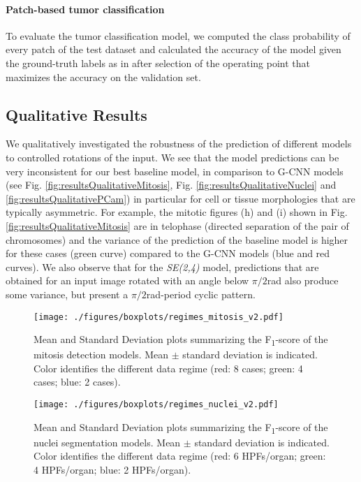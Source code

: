 \documentclass[twocolumn,final]{article}
\newcommand{\fscore}[1]{F\textsubscript{#1}-score}
\newcommand{\se}[1]{\textit{SE(#1)}}
\begin{document}
\paragraph{Patch-based tumor classification}
To evaluate the tumor classification model, we computed the class probability of every patch of the test dataset and calculated the accuracy of the model given the ground-truth labels as in \citet{veeling2018rotation} after selection of the operating point that maximizes the accuracy on the validation set.


\subsection{Qualitative Results}
\label{qualitativeResults}
We qualitatively investigated the robustness of the prediction of different models to controlled rotations of the input.
We see that the model predictions can be very inconsistent for our best baseline model, in comparison to G-CNN models (see Fig. \ref{fig:resultsQualitativeMitosis}, Fig. \ref{fig:resultsQualitativeNuclei} and \ref{fig:resultsQualitativePCam}) in particular for cell or tissue morphologies that are typically asymmetric.
For example, the mitotic figures (h) and (i) shown in Fig. \ref{fig:resultsQualitativeMitosis} are in telophase (directed separation of the pair of chromosomes) and the variance of the prediction of the baseline model is higher for these cases (green curve) compared to the G-CNN models (blue and red curves).
We also observe that for the \se{2,4} model, predictions that are obtained for an input image rotated with an angle below $\pi / 2$rad also produce some variance, but present a $\pi / 2$rad-period cyclic pattern.

\begin{figure}[ht!]
\begin{center}
\texttt{[image: ./figures/boxplots/regimes\_mitosis\_v2.pdf]}
\caption{
\footnotesize
Mean and Standard Deviation plots summarizing the \fscore{1} of the mitosis detection models.
Mean $\pm$ standard deviation is indicated.
Color identifies the different data regime (red: 8 cases; green: 4 cases; blue: 2 cases).}
\label{fig:boxPlotMitosis}
\end{center}
\end{figure}

\begin{figure}[ht!]
\begin{center}
\texttt{[image: ./figures/boxplots/regimes\_nuclei\_v2.pdf]}
\caption{
\footnotesize
Mean and Standard Deviation plots summarizing the \fscore{1} of the nuclei segmentation models.
Mean $\pm$ standard deviation is indicated.
Color identifies the different data regime (red: 6 HPFs/organ; green: 4 HPFs/organ; blue: 2 HPFs/organ).}
\label{fig:boxPlotNuclei}
\end{center}
\end{figure}
\end{document}
